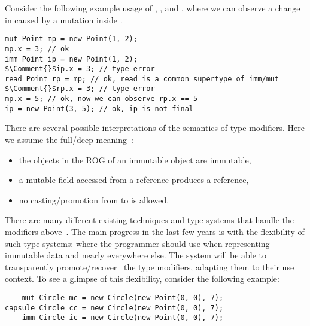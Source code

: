 Consider the following  example usage of \Q@mut@, \Q@imm@, and \Q@read@, where we can observe a change in \Q@rp@ caused by a mutation inside \Q@mp@.
\begin{lstlisting}
mut Point mp = new Point(1, 2);
mp.x = 3; // ok
imm Point ip = new Point(1, 2);
$\Comment{}$ip.x = 3; // type error
read Point rp = mp; // ok, read is a common supertype of imm/mut
$\Comment{}$rp.x = 3; // type error
mp.x = 5; // ok, now we can observe rp.x == 5
ip = new Point(3, 5); // ok, ip is not final
\end{lstlisting}


There are several possible interpretations of the semantics of type modifiers.
Here we assume the full/deep meaning~\cite{ZibinEtAl10,Potanin2013}:
\begin{itemize}
  \item the objects in the ROG of an immutable object are immutable,
  \item a mutable field accessed from a \Q@read@ reference produces a \Q@read@ reference,
  \item no casting/promotion from \Q@read@ to \Q@mut@ is allowed.
\end{itemize}

\noindent There are many different existing techniques and type systems that handle the modifiers above~\cite{ZibinEtAl10,ClarkeWrigstad03,HallerOdersky10,GordonEtAl12,ServettoZucca15}.
The main progress in the last few years is with the flexibility of such type systems:
 where the programmer should use \Q@imm@ when  representing immutable data
and \Q@mut@ nearly everywhere else. The system will be able to transparently promote/recover~\cite{GordonEtAl12,clebsch2015deny,ServettoZucca15} the type modifiers, adapting them to their use context.
To see a glimpse of this flexibility, consider the following example:
\begin{lstlisting}
    mut Circle mc = new Circle(new Point(0, 0), 7);
capsule Circle cc = new Circle(new Point(0, 0), 7);
    imm Circle ic = new Circle(new Point(0, 0), 7);
\end{lstlisting}

